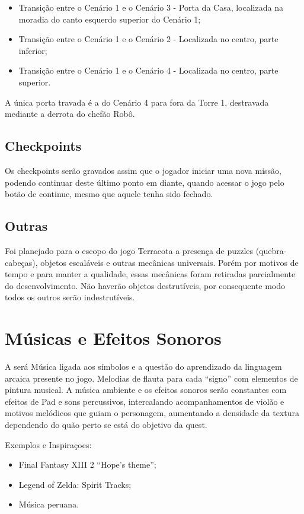 \documentclass[12pt]{article}
\begin{document}
\begin{itemize}
    \item Transição entre o Cenário 1 e o Cenário 3 - Porta da Casa, localizada na
    moradia do canto esquerdo superior do Cenário 1;
    \item Transição entre o Cenário 1 e o Cenário 2 - Localizada no centro, parte
    inferior;
    \item Transição entre o Cenário 1 e o Cenário 4 - Localizada no centro, parte
    superior.
\end{itemize}

A única porta travada é a do Cenário 4 para fora da Torre 1, destravada mediante
a derrota do chefão Robô.

\subsection{Checkpoints}
Os checkpoints serão gravados assim que o jogador iniciar uma nova missão, podendo
continuar deste último ponto em diante, quando acessar o jogo pelo botão de
continue, mesmo que aquele tenha sido fechado.

\subsection{Outras}
Foi planejado para o escopo do jogo Terracota a presença de puzzles (quebra-
cabeças), objetos escaláveis e outras mecânicas universais. Porém por motivos de
tempo e para manter a qualidade, essas mecânicas foram retiradas parcialmente do
desenvolvimento. Não haverão objetos destrutíveis, por consequente modo todos os
outros serão indestrutíveis.

\newpage

\section{Músicas e Efeitos Sonoros}
A será Música ligada aos símbolos e a questão do aprendizado da linguagem arcaica
presente no jogo. Melodias de flauta para cada “signo” com elementos de pintura
musical. A música ambiente e os efeitos sonoros serão constantes com efeitos de
Pad e sons percussivos, intercalando acompanhamentos de violão e motivos melódicos
que guiam o personagem, aumentando a densidade da textura dependendo do quão perto
se está do objetivo da quest.

Exemplos e Inspiraçoes:

\begin{itemize}
    \item Final Fantasy XIII 2 “Hope’s theme”;
    \item Legend of Zelda: Spirit Tracks;
    \item Música peruana.
\end{itemize}
\end{document}
